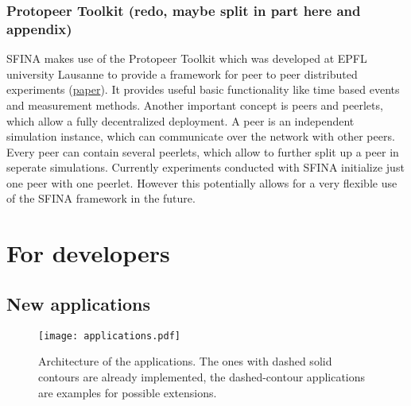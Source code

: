 \documentclass[11pt,fleqn]{book} %
\begin{document}

\section{Protopeer Toolkit (redo, maybe split in part here and appendix)}\label{subsec:protopeer}
SFINA makes use of the Protopeer Toolkit which was developed at EPFL university Lausanne to provide a framework for peer to peer distributed experiments (\href{http://infoscience.epfl.ch/record/128659/files/protopeer_demo.pdf}{paper}). It provides useful basic functionality like time based events and measurement methods. Another important concept is peers and peerlets, which allow a fully decentralized deployment. A peer is an independent simulation instance, which can communicate over the network with other peers. Every peer can contain several peerlets, which allow to further split up a peer in seperate simulations. Currently experiments conducted with SFINA initialize just one peer with one peerlet. However this potentially allows for a very flexible use of the SFINA framework in the future.



\part{For developers}



\chapter{New applications}

\begin{figure}[!ht]
\centering\texttt{[image: applications.pdf]}
\caption{Architecture of the applications. The ones with dashed solid contours are already implemented, the dashed-contour applications are examples for possible extensions.}
\label{fig:apps}
\end{figure}
\end{document}
